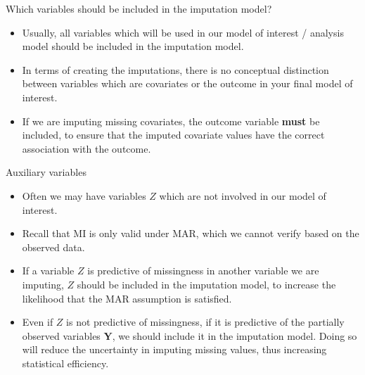 \documentclass[ignorenonframetext,]{beamer}
\providecommand{\tightlist}{%
  \setlength{\itemsep}{0pt}\setlength{\parskip}{0pt}}
\begin{document}
\begin{frame}{Which variables should be included in the imputation
model?}
\protect\hypertarget{which-variables-should-be-included-in-the-imputation-model}{}

\begin{itemize}
\tightlist
\item
  Usually, all variables which will be used in our model of interest /
  analysis model should be included in the imputation model.
\item
  In terms of creating the imputations, there is no conceptual
  distinction between variables which are covariates or the outcome in
  your final model of interest.
\item
  If we are imputing missing covariates, the outcome variable
  \textbf{must} be included, to ensure that the imputed covariate values
  have the correct association with the outcome.
\end{itemize}

\end{frame}

\begin{frame}{Auxiliary variables}
\protect\hypertarget{auxiliary-variables}{}

\begin{itemize}
\tightlist
\item
  Often we may have variables \(Z\) which are not involved in our model
  of interest.
\item
  Recall that MI is only valid under MAR, which we cannot verify based
  on the observed data.
\item
  If a variable \(Z\) is predictive of missingness in another variable
  we are imputing, \(Z\) should be included in the imputation model, to
  increase the likelihood that the MAR assumption is satisfied.
\item
  Even if \(Z\) is not predictive of missingness, if it is predictive of
  the partially observed variables \(\mathbf Y\), we should include it
  in the imputation model. Doing so will reduce the uncertainty in
  imputing missing values, thus increasing statistical efficiency.
\end{itemize}

\end{frame}
\end{document}
